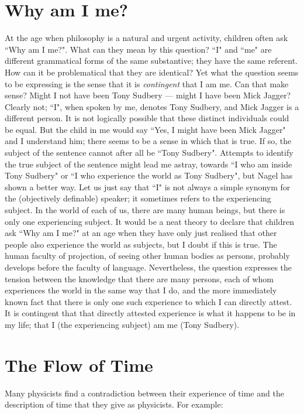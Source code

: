 \documentclass[12pt,a4paper,reqno]{article}
\renewcommand{\(}{\left(}
\renewcommand{\)}{\right)}
\newcommand{\<}{\langle}
\renewcommand{\>}{\rangle}
\theoremstyle{plain} %
\theoremstyle{definition}
\theoremstyle{remark}
\begin{document}
\goodbreak
\section{Why am I me?}

At the age when philosophy is a natural and urgent activity, children often ask
``Why am I me?". What can they mean by this question? ``I" and ``me" are
different grammatical forms of the same
substantive; they have the same referent. How can it be problematical
that they are identical? Yet what the question seems to be expressing is
the sense that it is \emph{contingent} that I am me. Can that make
sense? Might I not have been Tony Sudbery --- might I have been Mick
Jagger? Clearly not; ``I", when spoken by me, denotes Tony Sudbery, and
Mick Jagger is a different person. It is not logically possible that
these distinct individuals could be equal. But the child in me would say
``Yes, I might have been Mick Jagger" and I understand him; there seems
to be a
sense in which that is true. If so, the subject of the sentence cannot
after all be ``Tony Sudbery". Attempts to identify the true subject of
the sentence might lead me astray, towards ``I who am inside Tony
Sudbery" or ``I who experience the world as Tony Sudbery", but Nagel has
shown a better way. Let us just say that ``I" is not always a simple 
synonym for the (objectively definable) speaker; it sometimes refers to
the experiencing subject. In the world of each of us, there are many 
human beings, but there is only one experiencing subject. It would be a
neat theory to declare that children ask ``Why am I me?" at an age when
they have only just realised that other people also experience the world
as subjects, but I doubt if this is true. The human faculty of
projection, of seeing other human bodies as persons, probably develops before
the faculty of language. Nevertheless, the question
expresses the tension between the knowledge that there are many persons,
each of whom experiences the world in the same way that I do, and the
more immediately known fact that there is only one such experience to which
I can directly attest. It is contingent that that directly attested
experience is what it happens to be in my life; that I (the experiencing
subject) am me (Tony Sudbery).

\medskip
\section{The Flow of Time}

Many physicists find a contradiction between their experience of time
and the description of time that they give as physicists. For example:
\end{document}
